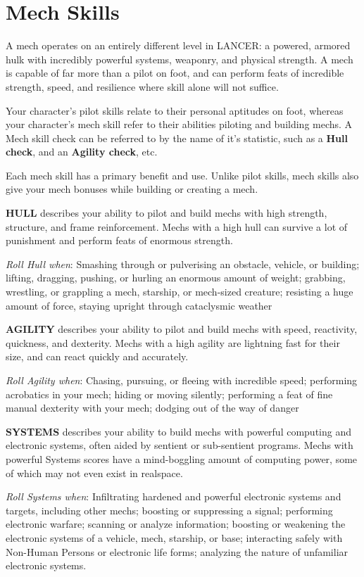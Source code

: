\section{Mech Skills}

A mech operates on an entirely different level in LANCER: a powered, armored hulk with incredibly powerful systems, weaponry, and physical strength. A mech is capable of far more than a pilot on foot, and can perform feats of incredible strength, speed, and resilience where skill alone will not suffice.

Your character’s pilot skills relate to their personal aptitudes on foot, whereas your character’s mech skill refer to their abilities piloting and building mechs. A Mech skill check can be referred to by the name of it’s statistic, such as a \textbf{Hull check}, and an \textbf{Agility check}, etc.

Each mech skill has a primary benefit and use. Unlike pilot skills, mech skills also give your mech bonuses while building or creating a mech.

\textbf{HULL} describes your ability to pilot and build mechs with high strength, structure, and frame reinforcement. Mechs with a high hull can survive a lot of punishment and perform feats of enormous strength.

\textit{Roll Hull when}: Smashing through or pulverising an obstacle, vehicle, or building; lifting, dragging, pushing, or hurling an enormous amount of weight; grabbing, wrestling, or grappling a mech, starship, or mech-sized creature; resisting a huge amount of force, staying upright through cataclysmic weather

\textbf{AGILITY} describes your ability to pilot and build mechs with speed, reactivity, quickness, and dexterity. Mechs with a high agility are lightning fast for their size, and can react quickly and accurately.

\textit{Roll Agility when}: Chasing, pursuing, or fleeing with incredible speed; performing acrobatics in your mech; hiding or moving silently; performing a feat of fine manual dexterity with your mech; dodging out of the way of danger

\textbf{SYSTEMS} describes your ability to build mechs with powerful computing and electronic systems, often aided by sentient or sub-sentient programs. Mechs with powerful Systems scores have a mind-boggling amount of computing power, some of which may not even exist in realspace.

\textit{Roll Systems when}: Infiltrating hardened and powerful electronic systems and targets, including other mechs; boosting or suppressing a signal; performing electronic warfare; scanning or analyze information; boosting or weakening the electronic systems of a vehicle, mech, starship, or base; interacting safely with Non-Human Persons or electronic life forms; analyzing the nature of unfamiliar electronic systems. 

